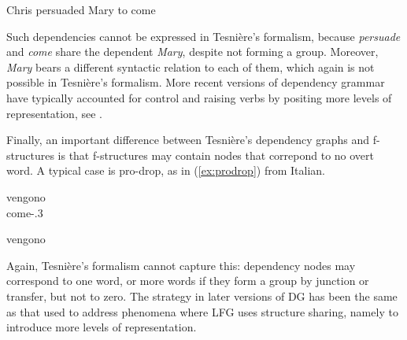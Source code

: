 \documentclass[output=paper,hidelinks]{langscibook}
\begin{document}
\begin{exe}
  \ex\label{ex:functionalcontrol}
  \begin{xlist}
    \ex Chris persuaded Mary to come
    \ex{}
  \end{xlist}
\end{exe}
%
Such dependencies cannot be expressed in Tesnière's formalism, because
\textit{persuade} and \textit{come} share the dependent \textit{Mary},
despite not forming a group. Moreover, \textit{Mary} bears a different
syntactic relation to each of them, which again is not possible in
Tesnière's formalism. More recent versions of dependency grammar have
typically accounted for control and raising verbs by positing more
levels of representation, see .

Finally, an important difference between Tesnière's dependency graphs and
f-structures is that f-structures may contain nodes that correpond to
no overt word. A typical case is pro-drop, as in (\ref{ex:prodrop}) from Italian.

\ea\label{ex:prodrop}
  \ea
    \gll vengono\\
    come-\PRS.3\PL\\

    \ex{}

    \ex
    \begin{dependency}[baseline=-0.6ex,theme=simple]
      \begin{deptext}
        vengono \\
      \end{deptext}
    \end{dependency}
  \z
\z
%
Again, Tesnière's formalism cannot capture this: dependency nodes may
correspond to one word, or more words if they form a group by junction
or transfer, but not to zero. The strategy in later versions of DG has
been the same as that used to address phenomena where LFG uses
structure sharing, namely to introduce more levels of representation.
\end{document}
